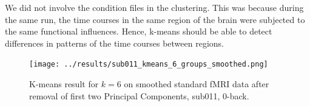 \documentclass[11pt]{article}
\begin{document}
We did not involve the condition files in the clustering. This was because during
the same run, the time courses in the same region of the brain were subjected to the
same functional influences. Hence, k-means should be able to detect differences in
patterns of the time courses between regions.

\begin{figure}[H]
\centering
\texttt{[image: ../results/sub011\_kmeans\_6\_groups\_smoothed.png]}
\caption{K-means result for $k=6$ on smoothed standard fMRI data after removal of first two Principal Components, sub011, 0-back.}
\end{figure} 
\end{document}
